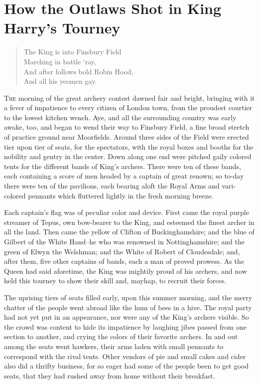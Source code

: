 \chapter{How the Outlaws Shot in King Harry’s Tourney}

\begin{quote}
The King is into Finsbury Field\\
Marching in battle ‘ray,\\
And after follows bold Robin Hood,\\
And all his yeomen gay.
\end{quote}

\lettrine{T}{he} morning of the great archery contest dawned fair and
bright, bringing with it a fever of impatience to every citizen of London
town, from the proudest courtier to the lowest kitchen wench. Aye, and
all the surrounding country was early awake, too, and began to wend their
way to Finsbury Field, a fine broad stretch of practice ground near
Moorfields. Around three sides of the Field were erected tier upon tier
of seats, for the spectators, with the royal boxes and booths for the
nobility and gentry in the center. Down along one end were pitched gaily
colored tents for the different bands of King's archers. There were ten
of these bands, each containing a score of men headed by a captain of
great renown; so to-day there were ten of the pavilions, each bearing
aloft the Royal Arms and vari-colored pennants which fluttered lightly
in the fresh morning breeze.

Each captain's flag was of peculiar color and device. First came the
royal purple streamer of Tepus, own bow-bearer to the King, and esteemed
the finest archer in all the land. Then came the yellow of Clifton of
Buckinghamshire; and the blue of Gilbert of the White Hand--he who was
renowned in Nottinghamshire; and the green of Elwyn the Welshman; and
the White of Robert of Cloudesdale; and, after them, five other captains
of bands, each a man of proved prowess. As the Queen had said aforetime,
the King was mightily proud of his archers, and now held this tourney to
show their skill and, mayhap, to recruit their forces.

The uprising tiers of seats filled early, upon this summer morning, and
the merry chatter of the people went abroad like the hum of bees in a
hive. The royal party had not yet put in an appearance, nor were any of
the King's archers visible. So the crowd was content to hide its
impatience by laughing jibes passed from one section to another, and
crying the colors of their favorite archers. In and out among the seats
went hawkers, their arms laden with small pennants to correspond with
the rival tents. Other vendors of pie and small cakes and cider also did
a thrifty business, for so eager had some of the people been to get good
seats, that they had rushed away from home without their breakfast.

